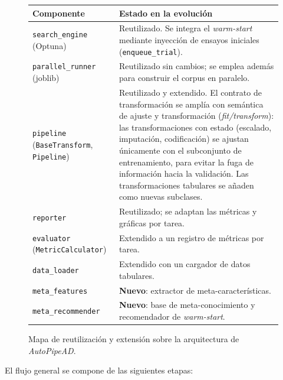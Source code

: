 \documentclass[12pt,letterpaper]{article}
\begin{document}
\begin{figure}[H]
\centering
\small
\begin{tabularx}{\textwidth}{>{\raggedright\arraybackslash}p{4.2cm} Y}
\toprule
{} \textbf{Componente} & \textbf{Estado en la evolución} \\
\midrule
\texttt{search\_engine} (Optuna) & Reutilizado. Se integra el \textit{warm-start} mediante inyección de ensayos iniciales (\texttt{enqueue\_trial}). \\
\texttt{parallel\_runner} (joblib) & Reutilizado sin cambios; se emplea además para construir el corpus en paralelo. \\
\texttt{pipeline} (\texttt{BaseTransform}, \texttt{Pipeline}) & Reutilizado y extendido. El contrato de transformación se amplía con semántica de ajuste y transformación (\textit{fit/transform}): las transformaciones con estado (escalado, imputación, codificación) se ajustan únicamente con el subconjunto de entrenamiento, para evitar la fuga de información hacia la validación. Las transformaciones tabulares se añaden como nuevas subclases. \\
\texttt{reporter} & Reutilizado; se adaptan las métricas y gráficas por tarea. \\
\texttt{evaluator} (\texttt{MetricCalculator}) & Extendido a un registro de métricas por tarea. \\
\texttt{data\_loader} & Extendido con un cargador de datos tabulares. \\
\texttt{meta\_features} & \textbf{Nuevo}: extractor de meta-características. \\
\texttt{meta\_recommender} & \textbf{Nuevo}: base de meta-conocimiento y recomendador de \textit{warm-start}. \\
\bottomrule
\end{tabularx}
\caption{Mapa de reutilización y extensión sobre la arquitectura de \textit{AutoPipeAD}.}
\label{fig:arq}
\end{figure}

El flujo general se compone de las siguientes etapas:
\end{document}
